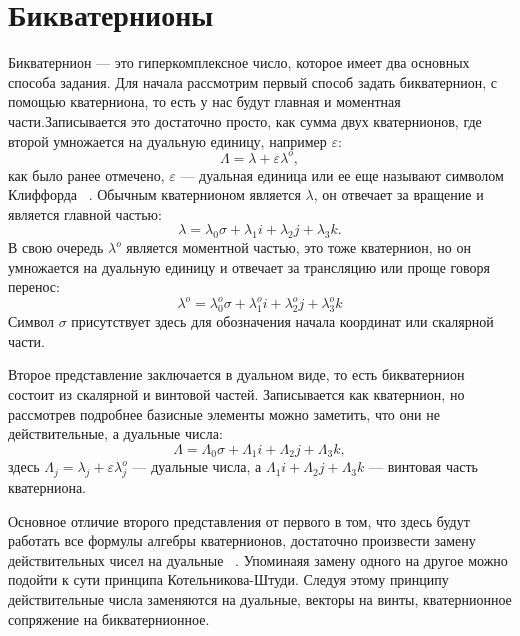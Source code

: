 \chapter{Бикватернионы}

\label{sec:DualQuaternion}

Бикватернион --- это гиперкомплексное число, которое имеет два основных способа задания.
Для начала рассмотрим первый способ задать бикватернион, с помощью кватерниона, то есть у нас будут главная и моментная части.Записывается это достаточно просто, как сумма двух кватернионов, где второй умножается на дуальную единицу, например $\varepsilon$:
\begin{equation*}
    \Lambda = \lambda + \varepsilon \lambda^o,
\end{equation*}
как было ранее отмечено, $\varepsilon$ --- дуальная единица или ее еще называют символом Клиффорда ~\cite{Chelnokov:2006}. Обычным кватернионом является $\lambda$, он отвечает за вращение и является главной частью:
\begin{equation*}
    \lambda = \lambda_0 \sigma + \lambda_1 i + \lambda_2 j + \lambda_3 k.
\end{equation*}
В свою очередь $\lambda^o$ является моментной частью, это тоже кватернион, но он умножается на дуальную единицу и отвечает за трансляцию или проще говоря перенос:
\begin{equation*}
    \lambda^o = \lambda_0^o \sigma + \lambda_1^o i + \lambda_2^o j + \lambda_3^o k
\end{equation*}
Символ $\sigma$ присутствует здесь для обозначения начала координат или скалярной части.

Второе представление заключается в дуальном виде, то есть бикватернион состоит из скалярной и винтовой частей. Записывается как кватернион, но рассмотрев подробнее базисные элементы можно заметить, что они не действительные, а дуальные числа:
\begin{equation*}
    \Lambda = \Lambda_0 \sigma + \Lambda_1 i + \Lambda_2 j + \Lambda_3 k,
\end{equation*}
здесь $\Lambda_j = \lambda_j + \varepsilon \lambda_j^o$ --- дуальные числа, а $\Lambda_1 i + \Lambda_2 j + \Lambda_3 k$ --- винтовая часть кватерниона.

Основное отличие второго представления от первого в том, что здесь будут работать все формулы алгебры кватернионов, достаточно произвести замену действительных чисел на дуальные ~\cite{Ziegler:1985}.
Упоминаяя замену одного на другое можно подойти к сути принципа Котельникова-Штуди. Следуя этому принципу действительные числа заменяются на дуальные, векторы на винты, кватернионное сопряжение на бикватернионное.

